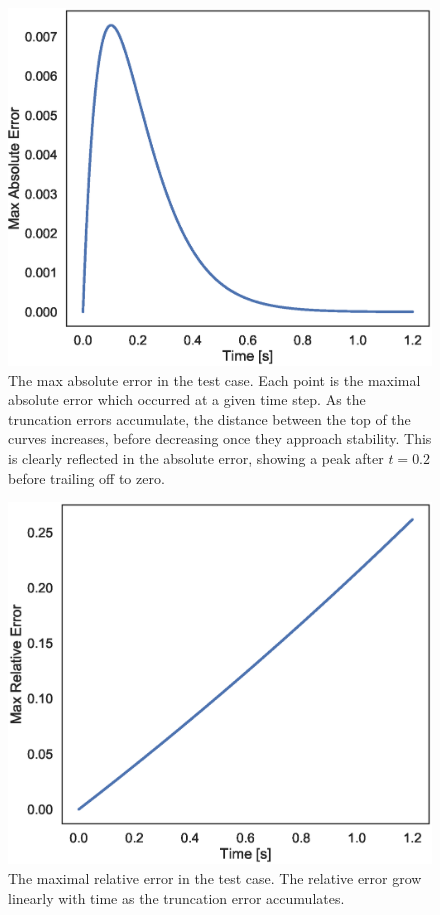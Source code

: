 \documentclass[aps,reprint]{revtex4-1}
\begin{document}
\begin{figure}[ht]
  \centering
  \includegraphics[width=\columnwidth]{figures/sin_absolute_error.eps}
  \caption{\label{fig:sinabserr} The max absolute error in the test case. Each
    point is the maximal absolute error which occurred at a given time step.
    As the truncation errors accumulate, the distance between the top of the
    curves increases, before decreasing once they approach stability. This is
    clearly reflected in the absolute error, showing a peak after \(t=0.2\)
    before trailing off to zero.}
\end{figure}
\begin{figure}[ht]
  \centering
  \includegraphics[width=\columnwidth]{figures/sin_relative_error.eps}
  \caption{\label{fig:sinrelerr} The maximal relative error in the test case.
    The relative error grow linearly with time as the truncation error accumulates.}
\end{figure}
\end{document}
